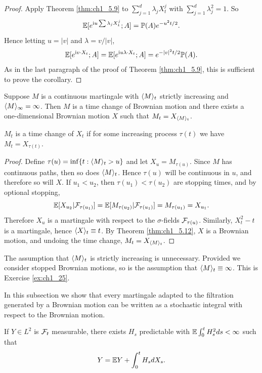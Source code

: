 \begin{proof}
Apply Theorem \ref{thm:ch1_5.9} to $\sum_{j=1}^d \lambda_j X_t^j$ with $\sum_{j=1}^d \lambda_j^2 = 1$. So
\[
    \mathbb{E}[e^{\mathrm{i} u\sum \lambda_j X_t^j}; A] = \mathbb{P}(A)e^{-u^2t/2}.
\]
Hence letting $u = |v|$ and $\lambda = v/|v|$,
\[
    \mathbb{E}[e^{\mathrm{i} v\cdot X_t}; A] = \mathbb{E}[e^{\mathrm{i} u\lambda\cdot X_t}; A] = e^{-|v|^2t/2}\mathbb{P}(A).
\]
As in the last paragraph of the proof of Theorem \ref{thm:ch1_5.9}, this is sufficient to prove the corollary.
\end{proof}

\begin{theorem}\label{thm:ch1_5.11}
Suppose $M$ is a continuous martingale with $\langle M \rangle_t$ strictly increasing and $\langle M \rangle_\infty = \infty$. Then $M$ is a time change of Brownian motion and there exists a one-dimensional Brownian motion $X$ such that $M_t = X_{\langle M \rangle_t}$.
\end{theorem}

$M_t$ is a time change of $X_t$ if for some increasing process $\tau(t)$ we have $M_t = X_{\tau(t)}$.

\begin{proof}
Define $\tau(u) = \inf\{t:\langle M \rangle_t > u\}$ and let $X_u = M_{\tau(u)}$. Since $M$ has continuous paths, then so does $\langle M \rangle_t$. Hence $\tau(u)$ will be continuous in $u$, and therefore so will $X$. If $u_1 < u_2$, then $\tau(u_1) < \tau(u_2)$ are stopping times, and by optional stopping,
\[
    \mathbb{E}[X_{u_2}| \mathcal{F}_{\tau(u_1)}] = \mathbb{E}[M_{\tau(u_2)}| \mathcal{F}_{\tau(u_1)}] = M_{\tau(u_1)} = X_{u_1}.
\]
Therefore $X_u$ is a martingale with respect to the $\sigma$-fields $\mathcal{F}_{\tau(u)}$. Similarly, $X_t^2 - t$ is a martingale, hence $\langle X \rangle_t \equiv t$. By Theorem \ref{thm:ch1_5.12}, $X$ is a Brownian motion, and undoing the time change, $M_t = X_{\langle M \rangle_t}$.
\end{proof}

The assumption that $\langle M \rangle_t$ is strictly increasing is unnecessary. Provided we consider stopped Brownian motions, so is the assumption that $\langle M \rangle_t\equiv \infty$. This is Exercise \ref{ex:ch1_25}.


In this subsection we show that every martingale adapted to the filtration generated by a Brownian motion can be written as a stochastic integral with respect to the Brownian motion.

\begin{theorem}\label{thm:ch1_5.12}
If $Y \in L^2$ is $\mathcal{F}_t$ measurable, there exists $H_s$ predictable with $\mathbb{E} \int_0^t H_s^2 ds < \infty$ such that
\mpagebreak
\begin{equation}\label{eq:ch1_5.10}
    Y = \mathbb{E} Y + \int_0^t H_s dX_s.
\end{equation}
\end{theorem}

